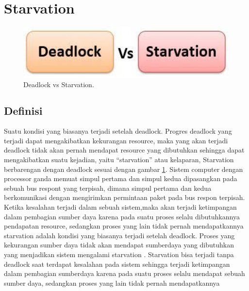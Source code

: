 

\section{Starvation}

\begin{figure}[ht]
	\centerline{\includegraphics[width=1\textwidth]{figures/starvationvsdeadlock.JPG}}
	\caption{Deadlock vs Starvation.}
	\label{starvationvsdeadlock}
\end{figure}


\subsection{Definisi}
Suatu kondisi yang biasanya terjadi setelah deadlock. Progres deadlock yang terjadi dapat mengakibatkan kekurangan resource, maka  yang akan terjadi deadlock tidak akan pernah mendapat resource yang dibutuhkan
sehingga dapat mengakibatkan suatu kejadian, yaitu “starvation” atau kelaparan, Starvation berbarengan dengan deadlock sesuai dengan gambar \ref{starvationvsdeadlock}.  
\cite{james1999method} Sistem computer dengan processor ganda memuat simpul pertama dan simpul kedua dipasangkan pada sebuah bus respont yang terpisah, dimana simpul pertama dan kedua berkomunikasi dengan mengirimkan permintaan paket pada bus respon terpisah.
Ketika kesalahan terjadi dalam sebuah sistem,maka akan terjadi ketimpangan dalam pembagian sumber daya karena pada suatu proses selalu dibutuhkannya pendapatan resource, sedangkan proses yang lain tidak pernah mendapatkannya
starvation adalah kondisi yang biasanya terjadi setelah deadlock. Proses yang kekurangan sumber daya tidak akan mendapat sumberdaya yang dibutuhkan yang menjadikan sistem mengalami starvation . Starvation bisa terjadi tanpa deadlock saat terdapat kesalahan pada sistem sehingga terjadi ketimpangan dalam pembagian sumberdaya karena pada suatu proses selalu mendapat sebuah sumber daya, sedangkan proses yang lain tidak pernah mendapatkannya
